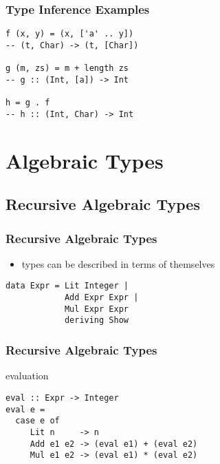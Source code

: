 \documentclass[dvipsnames]{beamer}
\theoremstyle{plain}
\begin{document}
\begin{frame}[fragile]
  \frametitle{Type Inference Examples}

  \begin{exampleblock}{}
    \begin{lstlisting}
f (x, y) = (x, ['a' .. y])
-- (t, Char) -> (t, [Char])

g (m, zs) = m + length zs
-- g :: (Int, [a]) -> Int

h = g . f
-- h :: (Int, Char) -> Int
    \end{lstlisting}
  \end{exampleblock}
\end{frame}

\section{Algebraic Types}

\subsection{Recursive Algebraic Types}

\begin{frame}[fragile]
  \frametitle{Recursive Algebraic Types}

  \begin{itemize}
    \item types can be described in terms of themselves
  \end{itemize}

  \begin{exampleblock}{}
    \begin{lstlisting}
data Expr = Lit Integer |
            Add Expr Expr |
            Mul Expr Expr
            deriving Show
    \end{lstlisting}
  \end{exampleblock}
\end{frame}

\begin{frame}[fragile]
  \frametitle{Recursive Algebraic Types}

  \begin{exampleblock}{evaluation}
    \begin{lstlisting}
eval :: Expr -> Integer
eval e =
  case e of
     Lit n     -> n
     Add e1 e2 -> (eval e1) + (eval e2)
     Mul e1 e2 -> (eval e1) * (eval e2)
    \end{lstlisting}
  \end{exampleblock}
\end{frame}
\end{document}
